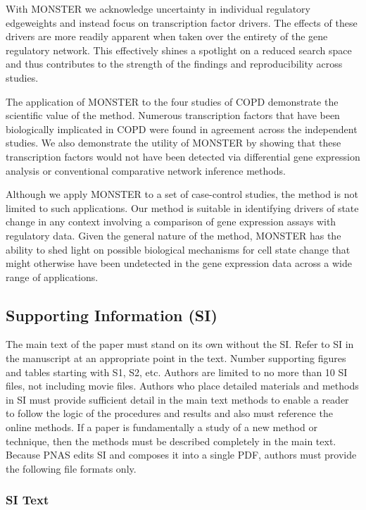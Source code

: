 \documentclass[9pt,twocolumn,twoside]{pnas-new}
\begin{document}
With MONSTER we acknowledge uncertainty in individual regulatory edgeweights
and instead focus on transcription factor drivers. The effects of
these drivers are more readily apparent when taken over the entirety
of the gene regulatory network. This effectively shines a spotlight
on a reduced search space and thus contributes to the strength of
the findings and reproducibility across studies.

The application of MONSTER to the four studies of COPD demonstrate
the scientific value of the method. Numerous transcription factors
that have been biologically implicated in COPD were found in agreement
across the independent studies. We also demonstrate the utility of
MONSTER by showing that these transcription factors would not have
been detected via differential gene expression analysis or conventional
comparative network inference methods.

Although we apply MONSTER to a set of case-control studies, the method
is not limited to such applications. Our method is suitable in identifying
drivers of state change in any context involving a comparison of gene
expression assays with regulatory data. Given the general nature of
the method, MONSTER has the ability to shed light on possible biological
mechanisms for cell state change that might otherwise have been undetected
in the gene expression data across a wide range of applications.

\subsection*{Supporting Information (SI)}

The main text of the paper must stand on its own without the SI. Refer to SI in the manuscript at an appropriate point in the text. Number supporting figures and tables starting with S1, S2, etc. Authors are limited to no more than 10 SI files, not including movie files. Authors who place detailed materials and methods in SI must provide sufficient detail in the main text methods to enable a reader to follow the logic of the procedures and results and also must reference the online methods. If a paper is fundamentally a study of a new method or technique, then the methods must be described completely in the main text. Because PNAS edits SI and composes it into a single PDF, authors must provide the following file formats only.

\subsubsection*{SI Text}
\end{document}
